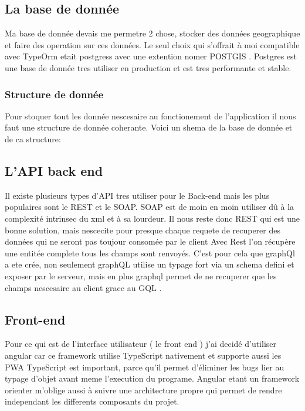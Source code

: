 \subsection{La base de donnée}\label{subsec:la-base-de-donnee}
Ma base de donnée devais me permetre 2 chose, stocker des données geographique et faire des operation sur ces données.
Le seul choix qui s'offrait à moi compatible avec TypeOrm etait postgress avec une extention nomer POSTGIS .
Postgres est une base de donnée tres utiliser en production et est tres performante et stable.

\subsubsection{Structure de donnée}
Pour stoquer tout les donnée nescesaire au fonctionement de l'application il nous faut une structure de donnée coherante.
Voici un shema de la base de donnée et de ca structure:


\subsection{L'API back end}\label{subsec:l'api-back-end}
Il existe plusieurs types d'API tres utiliser pour le Back-end mais les plus populaires sont le REST et le SOAP.
SOAP est de moin en moin utiliser dû à la complexité intrinsec du xml et à sa lourdeur.
Il nous reste donc REST qui est une bonne solution, mais nescecite pour presque chaque requete de recuperer des données qui ne seront pas toujour consomée par le client
Avec Rest l'on récupère une entitée complete tous les champs sont renvoyés.
C'est pour cela que graphQl a ete crée, non seulement graphQL utilise un typage fort via un schema defini et exposer par le serveur,
mais en plus graphql permet de ne recuperer que les champs nescesaire au client grace au GQL .




\subsection{Front-end}\label{subsec:front-end}
Pour ce qui est de l'interface utilisateur ( le front end ) j'ai decidé d'utiliser angular car ce framework utilise TypeScript nativement et supporte aussi les PWA
TypeScript est important, parce qu'il permet d'éliminer les bugs lier au typage d'objet avant meme l'execution du programe.
Angular etant un framework orienter m'oblige aussi à suivre une architecture propre qui permet de rendre independant les differents composants du projet.
